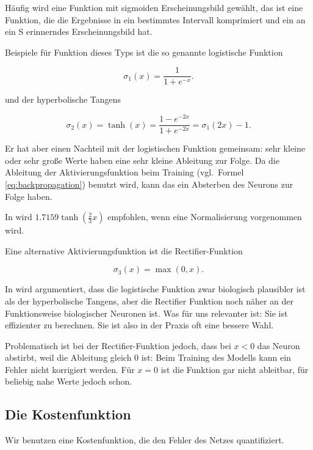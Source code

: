 Häufig wird eine Funktion mit sigmoiden Erscheinungsbild gewählt, das ist eine Funktion, die die Ergebnisse in ein bestimmtes Intervall komprimiert und ein an ein S erinnerndes Erscheinungsbild hat. 

Beispiele für Funktion dieses Typs ist die so genannte logistische Funktion

\begin{equation}
\sigma_1(x) = \frac{1}{1+e^{-x}}.
\end{equation}

und der hyperbolische Tangens

\begin{equation}
\sigma_2(x) = \tanh(x) = \frac{1-e^{-2x}}{1+e^{-2x}} = 
\sigma_1(2x) -1.
\end{equation}

Er hat aber einen Nachteil mit der logistischen Funktion gemeinsam: sehr kleine oder sehr große Werte haben eine sehr kleine Ableitung zur Folge. Da die Ableitung der Aktivierungsfunktion beim Training (vgl.~Formel \ref{eq:backpropagation}) benutzt wird, kann das ein Absterben des Neurons zur Folge haben. 

In \cite{lecunefficient} wird $1.7159 \tanh(\frac{2}{3} x)$ empfohlen, wenn eine Normalisierung vorgenommen wird. 

Eine alternative Aktivierungsfunktion ist die Rectifier-Funktion 

\begin{equation}
\sigma_3(x) = \max(0,x).
\end{equation} 

In \cite{glorot2011deep} wird argumentiert, dass die logistische Funktion zwar biologisch plausibler ist als der hyperbolische Tangens, aber die Rectifier Funktion noch näher an der Funktionsweise biologischer Neuronen ist. Was für uns relevanter ist: Sie ist effizienter zu berechnen. Sie ist also in der Praxis oft eine bessere Wahl. 

Problematisch ist bei der Rectifier-Funktion jedoch, dass bei $x < 0$ das Neuron abstirbt, weil die Ableitung gleich 0 ist: Beim Training des Modells kann ein Fehler nicht korrigiert werden. Für $x = 0$ ist die Funktion gar nicht ableitbar, für beliebig nahe Werte jedoch schon\cite{bengio2012practical}. 

\subsection{Die Kostenfunktion}
Wir benutzen eine Kostenfunktion, die den Fehler des Netzes quantifiziert.

